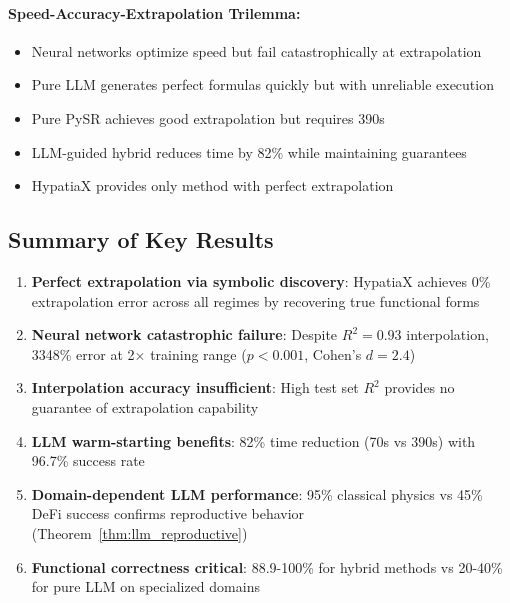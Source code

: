 \documentclass[twoside,11pt]{article}
\begin{document}
\paragraph{Speed-Accuracy-Extrapolation Trilemma:}
\begin{itemize}
\item Neural networks optimize speed but fail catastrophically at extrapolation
\item Pure LLM generates perfect formulas quickly but with unreliable execution
\item Pure PySR achieves good extrapolation but requires 390s
\item LLM-guided hybrid reduces time by 82\% while maintaining guarantees
\item HypatiaX provides only method with perfect extrapolation
\end{itemize}

\subsection{Summary of Key Results}

\begin{enumerate}
\item \textbf{Perfect extrapolation via symbolic discovery}: HypatiaX achieves 0\% extrapolation error across all regimes by recovering true functional forms

\item \textbf{Neural network catastrophic failure}: Despite $R^2 = 0.93$ interpolation, 3348\% error at 2$\times$ training range ($p < 0.001$, Cohen's $d = 2.4$)

\item \textbf{Interpolation accuracy insufficient}: High test set $R^2$ provides no guarantee of extrapolation capability

\item \textbf{LLM warm-starting benefits}: 82\% time reduction (70s vs 390s) with 96.7\% success rate

\item \textbf{Domain-dependent LLM performance}: 95\% classical physics vs 45\% DeFi success confirms reproductive behavior (Theorem~\ref{thm:llm_reproductive})

\item \textbf{Functional correctness critical}: 88.9-100\% for hybrid methods vs 20-40\% for pure LLM on specialized domains
\end{enumerate}

\end{document}
